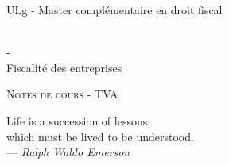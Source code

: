 \documentclass{book}
\begin{document}
\sffamily
\newcommand{\RPoint}{\protect\texttt{[image: point.png]}}
\newcommand{\RSave}{\protect\texttt{[image: Save.png]}}
\renewcommand\labelitemii{\ding{220}}
\begin{titlepage}

\begin{center}
\begin{Large}ULg - Master complémentaire en droit fiscal\end{Large}\\
\vspace{0.5cm}- \\
\vspace{0.5cm}
Fiscalité des entreprises

\end{center}
\vspace{6cm}

\LARGE
\begin{center}
\textsc{Notes de cours - TVA}\\
\end{center}

\vspace{10.0cm}

\normalsize
{}

\end{titlepage}

\newpage

\thispagestyle{empty}
\setcounter{page}{0}
\null

\newpage
\thispagestyle{empty}
\setcounter{page}{0}
\vspace{20cm}

\vfill
\begin{flushright}
Life is a succession of lessons, \\
which must be lived to be understood. \\ 
--- \textit{Ralph Waldo Emerson}
\end{flushright}
\vfill
\newpage

\renewcommand{\chaptermark}[1]{\markboth{#1}{}}
\renewcommand{\sectionmark}[1]{\markright{\thesection\ #1}}
\fancyhf{} \fancyhead[LE,RO]{\bfseries\thepage}
\fancyhead[LO]{\bfseries\rightmark}
\fancyhead[RE]{\bfseries\leftmark}
\renewcommand{\headrulewidth}{0.5pt}
\addtolength{\headheight}{0.5pt}
\renewcommand{\footrulewidth}{0pt}
\fancypagestyle{plain}{ \fancyhead{}
\renewcommand{\headrulewidth}{0pt}}
\end{document}
